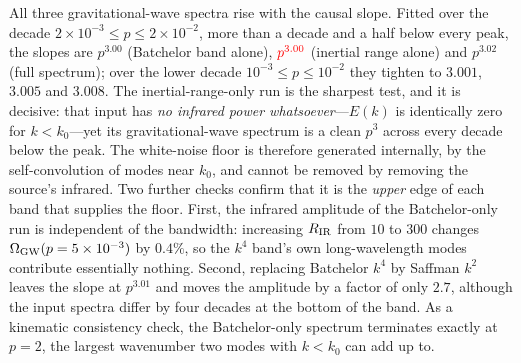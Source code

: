 \documentclass[10pt,prd,aps,nobibnotes,superscriptaddress,preprintnumbers,notitlepage]{revtex4-1}
\newcommand{\add}[1]{{\color{red}#1}}
\newcommand{\add}[1]{#1}
\begin{document}
All three gravitational-wave spectra rise with the causal slope. Fitted over the
decade $2\times10^{-3}\le p\le2\times10^{-2}$, more than a decade and a half below
every peak, the slopes are $p^{3.00}$ (Batchelor band alone), $\add{p^{3.00}}$ (inertial
range alone) and $p^{3.02}$ (full spectrum); over the lower decade
$10^{-3}\le p\le10^{-2}$ they tighten to $3.001$, $3.005$ and $3.008$. The
inertial-range-only run is the sharpest test, and it is decisive: that input has
\emph{no infrared power whatsoever}---$E(k)$ is identically zero for $k<k_0$---yet
its gravitational-wave spectrum is a clean $p^3$ across every decade below the
peak. The white-noise floor is therefore generated internally, by the
self-convolution of modes near $k_0$, and cannot be removed by removing the
source's infrared. Two further checks confirm that it is the \emph{upper} edge of
each band that supplies the floor. First, the infrared amplitude of the
Batchelor-only run is independent of the bandwidth: increasing $R_{\rm IR}$ from
$10$ to $300$ changes $\Omega_{\rm GW}(p=5\times10^{-3})$ by $0.4\%$, so the
$k^{4}$ band's own long-wavelength modes contribute essentially nothing. Second,
replacing Batchelor $k^4$ by Saffman $k^2$ leaves the slope at $p^{3.01}$ and
moves the amplitude by a factor of only $2.7$, although the input spectra differ
by four decades at the bottom of the band. As a kinematic consistency check, the
Batchelor-only spectrum terminates exactly at $p=2$, the largest wavenumber two
modes with $k<k_0$ can add up to.
\end{document}
